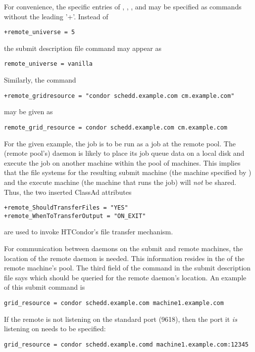 For convenience, the specific entries of 
, 
, 
, and
may be specified as  commands
without the leading '+'. 
Instead of 
\footnotesize
\begin{verbatim}
+remote_universe = 5
\end{verbatim}
\normalsize

the submit description file command may appear as

\footnotesize
\begin{verbatim}
remote_universe = vanilla
\end{verbatim}
\normalsize

Similarly, the command
\footnotesize
\begin{verbatim}
+remote_gridresource = "condor schedd.example.com cm.example.com"
\end{verbatim}
\normalsize

may be given as

\footnotesize
\begin{verbatim}
remote_grid_resource = condor schedd.example.com cm.example.com
\end{verbatim}
\normalsize

For the given example,
the job is to be run as a  
 job at the remote pool.
The (remote pool's)  daemon is likely to
place its job queue data on a local disk 
and execute the job on another machine within the pool of machines.
This implies that the file systems for the resulting submit machine
(the machine specified by ) and
the execute machine (the machine that runs the job) will
\emph{not} be shared.
Thus,
the two inserted ClassAd attributes
\footnotesize
\begin{verbatim}
+remote_ShouldTransferFiles = "YES"
+remote_WhenToTransferOutput = "ON_EXIT"
\end{verbatim}
\normalsize
are used to invoke HTCondor's file transfer mechanism. 

For communication between  daemons on the submit
and remote machines,
the location of the remote  daemon is needed.
This information resides in the  of the remote
machine's pool.
The third field of the  command in the submit description file
says which  should be queried for the remote 
daemon's location.
An example of this submit command is
\footnotesize
\begin{verbatim}
grid_resource = condor schedd.example.com machine1.example.com
\end{verbatim}
\normalsize
If the remote  is not listening on the standard port
(9618), then the port it \emph{is} listening on needs to be specified:
\footnotesize
\begin{verbatim}
grid_resource = condor schedd.example.comd machine1.example.com:12345
\end{verbatim}
\normalsize

